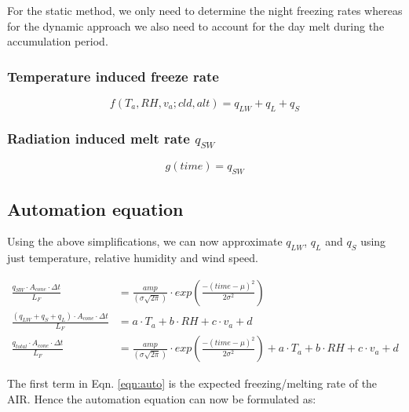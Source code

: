 \documentclass[utf8]{frontiersSCNS}
\begin{document}
For the static method, we only need to determine the night freezing rates whereas for the dynamic approach we
also need to account for the day melt during the accumulation period.

\subsubsection{Temperature induced freeze rate } \label{sec:Temp_rate}

\begin{equation}
	 f(T_a, RH, v_a; cld, alt) = q_{LW} + q_{L} + q_{S}
	\label{eqn:Temp_rate}
\end{equation}

\subsubsection{Radiation induced melt rate \texorpdfstring{$q_{SW}$}{Lg}}
\label{sec:SW}
\begin{equation}
	 g(time) = q_{SW}
	\label{eqn:Temp_rate}
\end{equation}

\subsection{Automation equation}

Using the above simplifications, we can now approximate $q_{LW}$, $q_{L}$ and $q_{S}$ using just temperature,
relative humidity and wind speed. 


\begin{subequations}

	\begin{align}
		\label{eqn:SW}
    \frac{q_{SW} \cdot A_{cone} \cdot \Delta t}{L_F} & = \frac{amp}{(\sigma \sqrt{2\pi})} \cdot
    exp\left(\frac{-(time-\mu)^2}{2\sigma^2}\right) \\
		\label{eqn:T}
    \frac{(q_{LW} + q_{S} + q_{L}) \cdot A_{cone} \cdot \Delta t}{L_F} & = a \cdot T_a + b \cdot RH + c \cdot v_a +
  d \\
		\label{eqn:auto}
    \frac{q_{total} \cdot A_{cone} \cdot \Delta t}{L_F} & = \frac{amp}{(\sigma \sqrt{2\pi})} \cdot
    exp\left(\frac{-(time-\mu)^2}{2\sigma^2}\right) + a \cdot T_a + b \cdot RH + c \cdot v_a + d
	\end{align}
\end{subequations}

The first term in Eqn. \ref{eqn:auto} is the expected freezing/melting rate of the AIR. Hence the automation
equation can now be formulated as:
\end{document}
